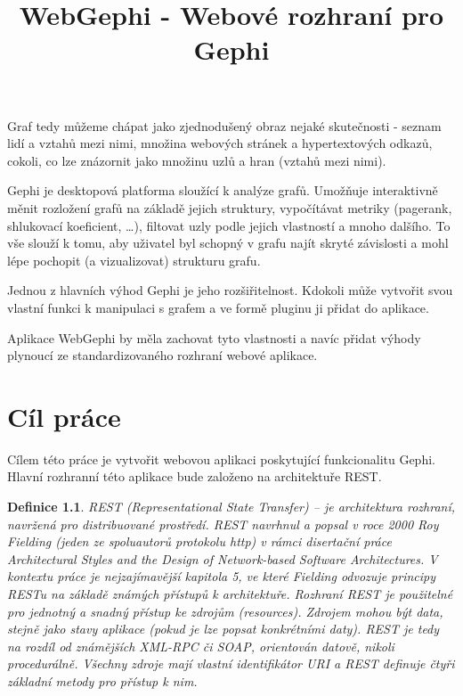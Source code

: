\documentclass[thesis=B,czech]{FITthesis}[2012/06/26]
\title{WebGephi - Webové rozhraní pro Gephi}
\newtheorem{definice}{Definice}
\begin{document}

\begin{introduction}
		
	Graf tedy můžeme chápat jako zjednodušený obraz nejaké skutečnosti -
	seznam lidí a vztahů mezi nimi, množina webových stránek a hypertextových odkazů, cokoli, co lze znázornit jako množinu uzlů a hran (vztahů mezi nimi).
	
	Gephi\cite{gephi} je desktopová platforma sloužící k analýze grafů. Umožňuje interaktivně měnit rozložení grafů na základě jejich struktury, vypočítávat metriky (pagerank, shlukovací koeficient, \ldots), 
	filtovat uzly podle jejich vlastností a mnoho dalšího. To vše slouží k tomu, aby uživatel byl schopný v grafu najít skryté závislosti a mohl lépe pochopit (a vizualizovat) strukturu grafu.
	
	Jednou z hlavních výhod Gephi je jeho rozšiřitelnost. Kdokoli může vytvořit svou vlastní funkci k manipulaci s grafem a ve formě pluginu ji přidat do aplikace.
	
	Aplikace WebGephi by měla zachovat tyto vlastnosti a navíc přidat výhody plynoucí ze standardizovaného rozhraní webové aplikace.  
\end{introduction}

\chapter{Cíl práce}
Cílem této práce je vytvořit webovou aplikaci poskytující funkcionalitu Gephi. Hlavní rozhranní této aplikace bude založeno na architektuře REST.

\begin{definice}
REST (Representational State Transfer) – je architektura rozhraní, navržená pro distribuované prostředí. REST navrhnul a popsal v roce 2000 Roy 
Fielding (jeden ze spoluautorů protokolu http) v rámci disertační práce Architectural Styles and the Design of Network-based Software Architectures. 
V kontextu práce je nejzajímavější kapitola 5, ve které Fielding odvozuje principy RESTu na základě známých přístupů k architektuře. 
Rozhraní REST je použitelné pro jednotný a snadný přístup ke zdrojům (resources). Zdrojem mohou být data, stejně jako stavy aplikace 
(pokud je lze popsat konkrétními daty). REST je tedy na rozdíl od známějších XML-RPC či SOAP, orientován datově, nikoli procedurálně. 
Všechny zdroje mají vlastní identifikátor URI a REST definuje čtyři základní metody pro přístup k nim.\cite{wiki:rest}
\end{definice}
\end{document}
